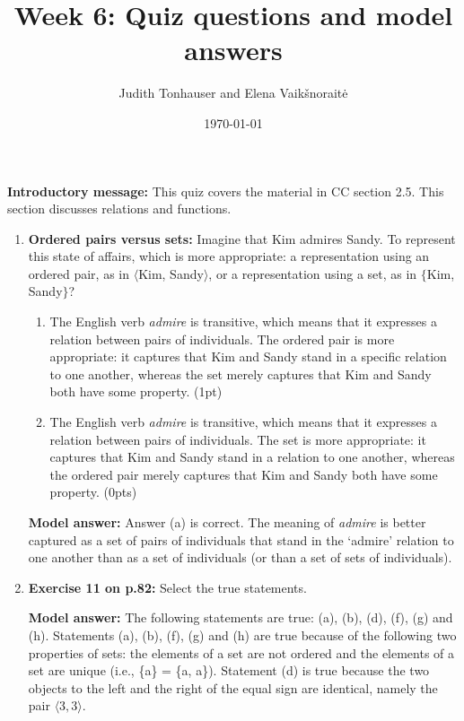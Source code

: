 \documentclass[a4,11pt]{article}
\title{Week 6: Quiz questions and model answers}
\author{Judith Tonhauser and Elena Vaik\v snorait\.{e} }
\date{\today}
\begin{document}
\maketitle

{\bf Introductory message:} This quiz covers the material in CC section 2.5. This section discusses relations and functions.

\begin{enumerate}[leftmargin = 12pt]

\item {\bf Ordered pairs versus sets:} Imagine that Kim admires Sandy. To represent this state of affairs, which is more appropriate: a representation using an ordered pair, as in $\langle$Kim, Sandy$\rangle$, or a representation using a set, as in $\{$Kim, Sandy$\}$?

 \begin{enumerate}[noitemsep]
        \item The English verb {\em admire} is transitive, which means that it expresses a relation between pairs of individuals. The ordered pair is more appropriate: it captures that Kim and Sandy stand in a specific relation to one another, whereas the set merely captures that Kim and Sandy both have some property. (1pt)
        
        \item The English verb {\em admire} is transitive, which means that it expresses a relation between pairs of individuals. The set is more appropriate: it captures that Kim and Sandy stand in a relation to one another, whereas the ordered pair merely captures that Kim and Sandy both have some property. (0pts)
\end{enumerate}

{\bf Model answer:} Answer (a) is correct. The meaning of {\em admire} is better captured as a set of pairs of individuals that stand in the `admire' relation to one another than as a set of individuals (or than a set of sets of individuals).

\item {\bf Exercise 11 on p.82:} Select the true statements.

{\bf Model answer:}  The following statements are true: (a), (b), (d), (f), (g) and (h). Statements (a), (b), (f), (g) and (h) are true because of the following two properties of sets: the elements of a set are not ordered and the elements of a set are unique (i.e., \{a\} = \{a, a\}). Statement (d) is true because the two objects to the left and the right of the equal sign are identical, namely the pair $\langle 3,3 \rangle$. 


\end{enumerate}
\end{document}
